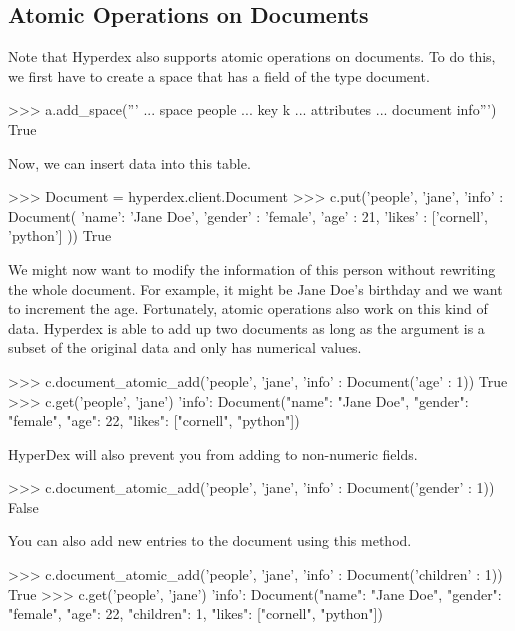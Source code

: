 \subsection{Atomic Operations on Documents}
Note that Hyperdex also supports atomic operations on documents. To do this, we first have to create a space that has a field of the type document.

\begin{pythoncode}
>>> a.add_space('''
... space people
... key k
... attributes
...    document info''')
True
\end{pythoncode}

Now, we can insert data into this table.

\begin{pythoncode}
>>> Document = hyperdex.client.Document
>>> c.put('people', 'jane', {'info' : Document( {'name': 'Jane Doe', 'gender' : 'female', 'age' : 21, 'likes' : ['cornell', 'python']} )})
True
\end{pythoncode}

We might now want to modify the information of this person without rewriting the whole document. For example, it might be Jane Doe's birthday and we want to increment the age.
Fortunately, atomic operations also work on this kind of data. Hyperdex is able to add up two documents as long as the argument is a subset of the original data and only has numerical values.

\begin{pythoncode}
>>> c.document_atomic_add('people', 'jane', {'info' : Document({'age' : 1})})
True
>>> c.get('people', 'jane')
{'info': Document({"name": "Jane Doe", "gender": "female", "age": 22, "likes": ["cornell", "python"]})}
\end{pythoncode}

HyperDex will also prevent you from adding to non-numeric fields.

\begin{pythoncode}
>>> c.document_atomic_add('people', 'jane', {'info' : Document({'gender' : 1})})
False
\end{pythoncode}

You can also add new entries to the document using this method.

\begin{pythoncode}
>>> c.document_atomic_add('people', 'jane', {'info' : Document({'children' : 1})})
True
>>> c.get('people', 'jane')
{'info': Document({"name": "Jane Doe", "gender": "female", "age": 22, "children": 1, "likes": ["cornell", "python"]})}
\end{pythoncode}


